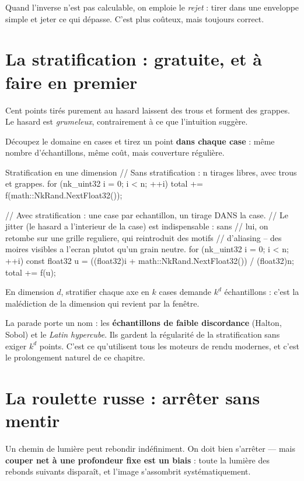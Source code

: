 Quand l'inverse n'est pas calculable, on emploie le \emph{rejet} : tirer dans
une enveloppe simple et jeter ce qui dépasse. C'est plus coûteux, mais toujours
correct.

\section{La stratification : gratuite, et à faire en premier}

Cent points tirés purement au hasard laissent des trous et forment des grappes.
Le hasard est \emph{grumeleux}, contrairement à ce que l'intuition suggère.

Découpez le domaine en cases et tirez un point \textbf{dans chaque case} : même
nombre d'échantillons, même coût, mais couverture régulière.

\begin{nkcode}{Stratification en une dimension}
// Sans stratification : n tirages libres, avec trous et grappes.
for (nk_uint32 i = 0; i < n; ++i)
    total += f(math::NkRand.NextFloat32());

// Avec stratification : une case par echantillon, un tirage DANS la case.
// Le jitter (le hasard a l'interieur de la case) est indispensable : sans
// lui, on retombe sur une grille reguliere, qui reintroduit des motifs
// d'aliasing -- des moires visibles a l'ecran plutot qu'un grain neutre.
for (nk_uint32 i = 0; i < n; ++i) {
    const float32 u = ((float32)i + math::NkRand.NextFloat32()) / (float32)n;
    total += f(u);
}
\end{nkcode}

\begin{nkpiege}
En dimension $d$, stratifier chaque axe en $k$ cases demande $k^d$
échantillons : c'est la malédiction de la dimension qui revient par la fenêtre.

La parade porte un nom : les \textbf{échantillons de faible discordance}
(Halton, Sobol) et le \emph{Latin hypercube}. Ils gardent la régularité de la
stratification sans exiger $k^d$ points. C'est ce qu'utilisent tous les moteurs
de rendu modernes, et c'est le prolongement naturel de ce chapitre.
\end{nkpiege}

\section{La roulette russe : arrêter sans mentir}

Un chemin de lumière peut rebondir indéfiniment. On doit bien s'arrêter — mais
\textbf{couper net à une profondeur fixe est un biais} : toute la lumière des
rebonds suivants disparaît, et l'image s'assombrit systématiquement.


